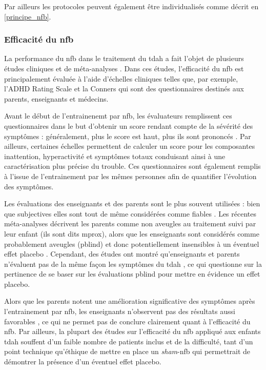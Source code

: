 Par ailleurs les protocoles peuvent également être individualisés comme décrit en \ref{principe_nfb}.

\subsubsection{Efficacité du \gls{nfb}}

La performance du \gls{nfb} dans le traitement du \gls{tdah} a fait l'objet de plusieurs études cliniques \citep{Escolano2014, Maurizio2014, Strehl2017} 
et de méta-analyses \citep{Arns2009, Micoulaud2014, Sonuga-Barke2013, Cortese2016, Catala2017, Lambez2019}. Dans ces études, l'efficacité du \gls{nfb} est 
principalement évaluée à l'aide d'échelles cliniques telles que, par exemple, l'ADHD Rating Scale \citep{Pappas2006} et la Conners \citep{Conners2008} qui sont 
des questionnaires destinés aux parents, enseignants et médecins. 

Avant le début de l'entrainenemt par \gls{nfb}, les évaluateurs remplissent ces questionnaires dans le but d'obtenir un score rendant compte de 
la sévérité des symptômes : généralement, plus le score est haut, plus ils sont prononcés \citep{Pappas2006, Conners2008}. Par ailleurs, certaines échelles 
permettent de calculer un score pour les composantes inattention, hyperactivité et symptômes totaux \citep{Pappas2006} conduisant ainsi à une caractérisation 
plus précise du trouble. Ces questionnaires sont également remplis à l'issue de l'entrainement par les mêmes personnes afin de quantifier l'évolution 
des symptômes. 

Les évaluations des enseignants et des parents sont le plus souvent utilisées : bien que subjectives elles sont tout de même considérées comme fiables 
\citep{Mcgough2004}. Les récentes méta-analyses décrivent les parents comme non aveugles au traitement suivi par leur enfant (ils sont dits \gls{mprox}), alors
que les enseignants sont considérés comme probablement aveugles (\gls{pblind}) et donc potentiellement insensibles à un éventuel effet placebo 
\citep{Micoulaud2014, Cortese2016}. Cependant, des études ont montré qu'enseignants et parents n'évaluent pas de la même façon les symptômes du \gls{tdah}
\citep{Sollie2013, Narad2015, Minder2018}, ce qui questionne sur la pertinence de se baser sur les évaluations \gls{pblind} pour mettre en évidence un 
effet placebo.

Alors que les parents notent une amélioration significative des symptômes après l'entrainement par \gls{nfb}, les enseignants n'observent pas des
résultats aussi favorables \citep{Arns2009, Sonuga-Barke2013, Cortese2016}, ce qui ne permet pas de conclure clairement quant à l'efficacité du \gls{nfb}.
Par ailleurs, la plupart des études sur l'efficacité du \gls{nfb} appliqué aux enfants \gls{tdah} souffent d'un faible nombre de patients inclus 
\citep{Baumeister2016, Heinrich2004} et de la difficulté, tant d'un point technique qu'éthique \citep{Birbaumer1991, Holtmann2014} de mettre en place 
un \textit{sham}-\gls{nfb} qui permettrait de démontrer la présence d'un éventuel effet placebo.


